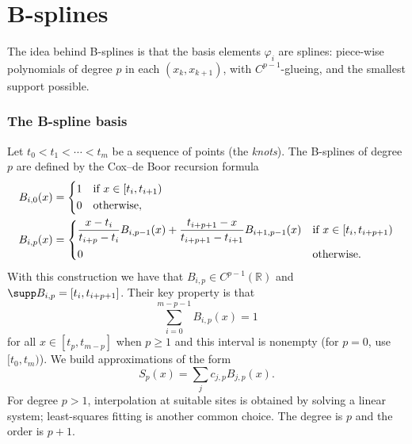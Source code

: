 \section{B-splines}
\label{sec:FEM Bsplines d=1}

The idea behind B-splines is that the basis elements $\varphi_i$ are splines: piece-wise polynomials of degree $p$ in each $(x_{k}, x_{k+1})$, with $C^{p-1}$-glueing, and the smallest support possible.

\subsubsection{The B-spline basis} Let $t_0 < t_{1} < \cdots < t_m$ be a sequence of points (the \emph{knots}).
The B-splines of degree $p$ are defined by the Cox--de Boor recursion formula
\begin{subequations}
    \label{eq:B-spline}
    \begin{align}
        B_{i,0} (x) & = \begin{dcases}
                            1 & \text{if } x \in [t_i, t_{i+1}) \\
                            0 & \text{otherwise},
                        \end{dcases}
        \\
        B_{i,p} (x) & = \begin{dcases}
                            \frac{x-t_i}{t_{i+p} - t_i} B_{i,p-1}(x) + \frac{t_{i+p+1}-x}{t_{i+p+1} - t_{i+1}} B_{i+1,p-1}(x)
                              & \text{if } x \in [t_i, t_{i+p+1}) \\
                            0 & \text{otherwise}.
                        \end{dcases}
    \end{align}
\end{subequations}
With this construction we have that $B_{i,p} \in C^{p-1} (\mathbb R)$ and $\supp B_{i,p} = [t_i, t_{i+p+1}]$.
Their key property is that
\begin{equation*}
    \sum_{i=0}^{m-p-1} B_{i,p}(x) = 1
\end{equation*}
for all $x\in[t_p,t_{m-p}]$ when $p\ge1$ and this interval is nonempty (for $p=0$, use $[t_0,t_m)$).
We build approximations of the form
\begin{equation*}
    S_p (x) = \sum_j c_{j,p} B_{j,p}(x).
\end{equation*}
For degree $p>1$, interpolation at suitable sites is obtained by solving a linear system; least-squares fitting is another common choice. The degree is $p$ and the order is $p+1$.

